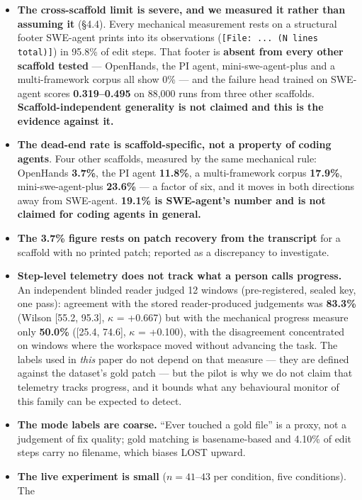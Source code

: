\documentclass[10pt]{article}
\newcommand{\code}[1]{\texttt{\small #1}}
\begin{document}
\begin{itemize}[leftmargin=1.3em,itemsep=1pt]
\item \textbf{The cross-scaffold limit is severe, and we measured it rather than assuming it}
  (\S4.4). Every mechanical measurement rests on a structural footer SWE-agent prints into its
  observations (\code{[File: ... (N lines total)]}) in 95.8\% of edit steps. That footer is
  \textbf{absent from every other scaffold tested} --- OpenHands, the PI agent, mini-swe-agent-plus
  and a multi-framework corpus all show 0\% --- and the failure head trained on SWE-agent scores
  \textbf{0.319--0.495} on 88{,}000 runs from three other scaffolds. \textbf{Scaffold-independent
  generality is not claimed and this is the evidence against it.}
\item \textbf{The dead-end rate is scaffold-specific, not a property of coding agents}. Four other
  scaffolds, measured by the same mechanical rule: OpenHands \textbf{3.7\%}, the PI agent
  \textbf{11.8\%}, a multi-framework corpus \textbf{17.9\%}, mini-swe-agent-plus \textbf{23.6\%} ---
  a factor of six, and it moves in both directions away from SWE-agent. \textbf{19.1\% is
  SWE-agent's number and is not claimed for coding agents in general.}
\item \textbf{The 3.7\% figure rests on patch recovery from the transcript} for a scaffold with no
  printed patch; reported as a discrepancy to investigate.
\item \textbf{Step-level telemetry does not track what a person calls progress.} An independent
  blinded reader judged 12 windows (pre-registered, sealed key, one pass): agreement with the
  stored reader-produced judgements was \textbf{83.3\%} (Wilson [55.2, 95.3], $\kappa$ = +0.667)
  but with the mechanical progress measure only \textbf{50.0\%} ([25.4, 74.6], $\kappa$ = +0.100),
  with the disagreement concentrated on windows where the workspace moved without advancing the
  task. The labels used in \emph{this} paper do not depend on that measure --- they are defined
  against the dataset's gold patch --- but the pilot is why we do not claim that telemetry tracks
  progress, and it bounds what any behavioural monitor of this family can be expected to detect.
\item \textbf{The mode labels are coarse.} ``Ever touched a gold file'' is a proxy, not a judgement
  of fix quality; gold matching is basename-based and 4.10\% of edit steps carry no filename, which
  biases LOST upward.
\item \textbf{The live experiment is small} ($n = 41$--$43$ per condition, five conditions). The

\end{itemize}
\end{document}
